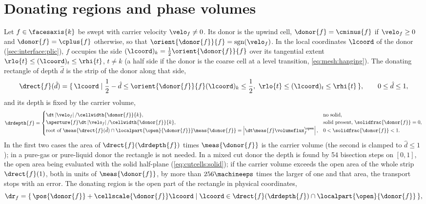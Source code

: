 \section{Donating regions and phase volumes}\label{sec:vof:donating}
Let $f\in\facesaxis{k}$ be swept with carrier velocity $\velo_f\neq0$. Its
donor is the upwind cell,
$\donor{f}=\cminus{f}$ if $\velo_f\ge0$ and $\donor{f}=\cplus{f}$ otherwise,
so that $\orient{\donor{f}}{f}=\operatorname{sgn}(\velo_f)$. In the local
coordinates $\lcoord$ of the donor (\cref{sec:interface:plic}), $f$ occupies
the side $(\lcoord)_k=\half\orient{\donor{f}}{f}$ over its tangential extent
$\rlo{t}\le(\lcoord)_t\le\rhi{t}$, $t\neq k$ (a half side if the donor is the
coarse cell at a level transition, \cref{eq:mesh:hanging}). The donating
rectangle of depth $\hat d$ is the strip of the donor along that side,
\begin{equation}\label{eq:vof:rectangle}
  \drect{f}(\hat d)=\set{\lcoord}{\half-\hat d\le\orient{\donor{f}}{f}(\lcoord)_k\le\half,\
    \rlo{t}\le(\lcoord)_t\le\rhi{t}},\qquad 0\le\hat d\le1,
\end{equation}
and its depth is fixed by the carrier volume,
\begin{equation}\label{eq:vof:depth}
  \drdepth{f}=\begin{cases}
    \dt\abs{\velo_f}/\cellwidth{\donor{f}}{k}, & \text{no solid},\\
    \aperture{f}\dt\abs{\velo_f}/\cellwidth{\donor{f}}{k}, & \text{solid present, }\solidfrac{\donor{f}}=0,\\
    \text{root of }\meas{\drect{f}(\hat d)\cap\localpart{\open}{\donor{f}}}\meas{\donor{f}}
      =\abs{\dt\meas{f}\volumeflux^{\open}_f}, & 0<\solidfrac{\donor{f}}<1 .
  \end{cases}
\end{equation}
In the first two cases the area of $\drect{f}(\drdepth{f})$ times
$\meas{\donor{f}}$ is the carrier volume (the second is clamped to
$\hat d\le1$); in a pure-gas or pure-liquid donor the rectangle is not
needed. In a mixed cut donor the depth is found by 54 bisection steps on
$[0,1]$, the open area being evaluated with the solid half-plane
(\cref{eq:cutcells:solid}); if the carrier volume exceeds the open area of
the whole strip $\drect{f}(1)$, both in units of $\meas{\donor{f}}$, by more
than $256\machineeps$ times the larger of one and that area, the transport
stops with an error. The donating region is the open part of the rectangle
in physical coordinates,
\begin{equation}\label{eq:vof:region}
  \dr_f=\set{\pos{\donor{f}}+\cellscale{\donor{f}}\lcoord}{\lcoord\in\drect{f}(\drdepth{f})\cap\localpart{\open}{\donor{f}}},
\end{equation}
